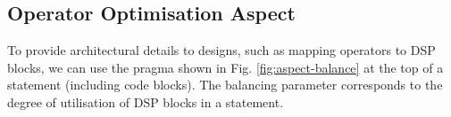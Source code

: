\begin{comment}
\lstset{style=lara}
\begin{figure}[!h]
\begin{lstlisting}
aspectdef AspReconfig
input
   partition
end
select function.call end
apply
   if ($call.key in partition) {
      var cfg = partition[$call.key].cfg;
      var hw = partition[$call.key].hw;
      $call.insert before %{
         #pragma FAST hw:[[hw]] cfg:[[cfg]]
      }%;
   }
end
end
\end{lstlisting}
\caption{Reconfiguration aspect.}
\label{fig:aspect-reconf}
\end{figure}

Table \ref{fig:aspect-hash} shows an example of a hash table
representing a hardware partition. The key (e.g. main:f:1) identifies
a function call in the application, and is formed by concatenating the
name of the caller function (main), the name of the invoked function
(e.g. f) and a unique number (1).  Line~5 in the aspect shown in
Fig.~\ref{fig:aspect-reconf} selects all function calls, and for each
call found in the input partition (line~7), we set the appropriate
pragma on top of the call statement (lines 10--12). We can now realize
and experiment different reconfiguration designs by invoking this
aspect with different hardware partitions.


\begin{table}[!h]
\caption{An example of a hardware partition, represented as a hash
  table, used with the reconfiguration aspect
  (Fig.~\ref{fig:aspect-reconf})}
\label{fig:aspect-hash}
\centering
\begin{tabular}{c|c|c}
\hline
\multicolumn{3}{c}{\bf{partition}} \\
\hline
\bf{\$call.key} & \bf{hw} & \bf{cfg}  \\
\hline
main:f:1 & fast\_f0 & c0 \\
main:f:2 & fast\_f1 & c1 \\
main:g:3 & fast\_g & c1 \\
\hline
\end{tabular}
\end{table}

\end{comment}

\subsection{Operator Optimisation Aspect}
\label{sect:asp_ops}
To provide architectural details to \MAXC{} designs, such as mapping
operators to DSP blocks, we can use the \MAXC{} pragma shown in
Fig. \ref{fig:aspect-balance} at the top of a statement (including code
blocks). The balancing parameter corresponds to the degree of
utilisation of DSP blocks in a statement.

